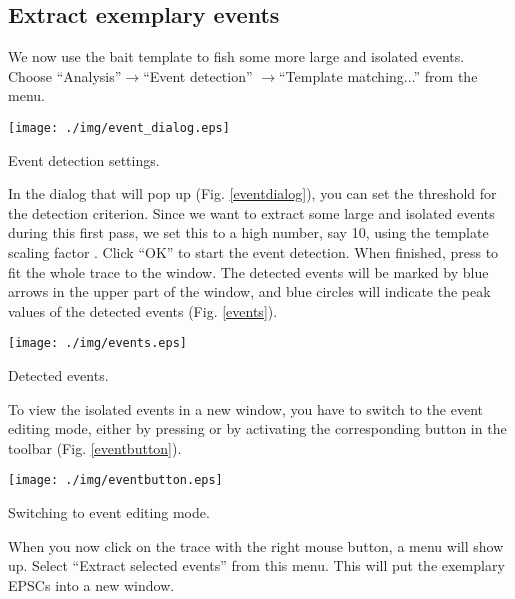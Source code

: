 \subsection{Extract exemplary events}
We now use the bait template to fish some more large and isolated events. Choose ``Analysis''$\rightarrow$``Event detection'' $\rightarrow$``Template matching...'' from the menu.
  \begin{myfigure}[htb]
    \begin{center}
      \texttt{[image: ./img/event\_dialog.eps]}
    \end{center}
    \caption{Event detection settings.}
    \label{eventdialog}
  \end{myfigure}
In the dialog that will pop up (Fig. \ref{eventdialog}), you can set the threshold for the detection criterion. Since we want to extract some large and isolated events during this first pass, we set this to a high number, say 10, using the template scaling factor \cite{Clements97}. Click ``OK'' to start the event detection. When finished, press  to fit the whole trace to the window. The detected events will be marked by blue arrows in the upper part of the window, and blue circles will indicate the peak values of the detected events (Fig. \ref{events}).
  \begin{myfigure}[htb]
    \begin{center}
      \texttt{[image: ./img/events.eps]}
    \end{center}
    \caption{Detected events.}
    \label{events}
  \end{myfigure}
To view the isolated events in a new window, you have to switch to the event editing mode, either by pressing  or by activating the corresponding button in the toolbar (Fig. \ref{eventbutton}).
  \begin{myfigure}[htb]
    \begin{center}
      \texttt{[image: ./img/eventbutton.eps]}
    \end{center}
    \caption{Switching to event editing mode.}
    \label{eventbutton}
  \end{myfigure}
When you now click on the trace with the right mouse button, a menu will show up. Select ``Extract selected events'' from this menu. This will put the exemplary EPSCs into a new window.

